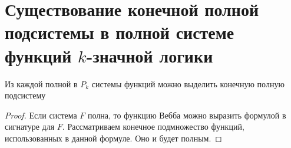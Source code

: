 \section{Существование конечной полной подсистемы в полной системе функций $k$-значной логики}

\begin{theorem}
    Из каждой полной в $P_k$ системы функций можно выделить конечную полную подсистему
\end{theorem}

\begin{proof}
    Если система $F$ полна, то функцию Вебба можно выразить формулой в сигнатуре для $F$. Рассматриваем конечное подмножество функций, использованных в данной формуле. Оно и будет полным.
\end{proof}

